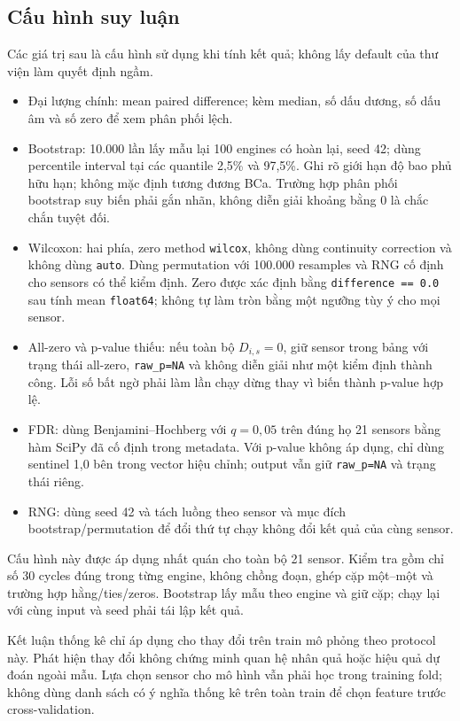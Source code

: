 \subsection{Cấu hình suy luận}
Các giá trị sau là cấu hình sử dụng khi tính kết quả; không lấy default của thư viện làm quyết định ngầm.
\begin{itemize}
\item Đại lượng chính: mean paired difference; kèm median, số dấu dương, số dấu âm và số zero để xem phân phối lệch.
\item Bootstrap: 10.000 lần lấy mẫu lại 100 engines có hoàn lại, seed 42; dùng percentile interval tại các quantile 2,5\% và 97,5\%. Ghi rõ giới hạn độ bao phủ hữu hạn; không mặc định tương đương BCa. Trường hợp phân phối bootstrap suy biến phải gắn nhãn, không diễn giải khoảng bằng 0 là chắc chắn tuyệt đối.
\item Wilcoxon: hai phía, zero method \texttt{wilcox}, không dùng continuity correction và không dùng \texttt{auto}. Dùng permutation với 100.000 resamples và RNG cố định cho sensors có thể kiểm định. Zero được xác định bằng \texttt{difference == 0.0} sau tính mean \texttt{float64}; không tự làm tròn bằng một ngưỡng tùy ý cho mọi sensor.
\item All-zero và p-value thiếu: nếu toàn bộ $D_{i,s}=0$, giữ sensor trong bảng với trạng thái all-zero, \texttt{raw\_p=NA} và không diễn giải như một kiểm định thành công. Lỗi số bất ngờ phải làm lần chạy dừng thay vì biến thành p-value hợp lệ.
\item FDR: dùng Benjamini--Hochberg với $q=0{,}05$ trên đúng họ 21 sensors bằng hàm SciPy đã cố định trong metadata. Với p-value không áp dụng, chỉ dùng sentinel 1,0 bên trong vector hiệu chỉnh; output vẫn giữ \texttt{raw\_p=NA} và trạng thái riêng.
\item RNG: dùng seed 42 và tách luồng theo sensor và mục đích bootstrap/permutation để đổi thứ tự chạy không đổi kết quả của cùng sensor.
\end{itemize}

Cấu hình này được áp dụng nhất quán cho toàn bộ 21 sensor. Kiểm tra gồm chỉ số 30 cycles đúng trong từng engine, không chồng đoạn, ghép cặp một--một và trường hợp hằng/ties/zeros. Bootstrap lấy mẫu theo engine và giữ cặp; chạy lại với cùng input và seed phải tái lập kết quả.

Kết luận thống kê chỉ áp dụng cho thay đổi trên train mô phỏng theo protocol này. Phát hiện thay đổi không chứng minh quan hệ nhân quả hoặc hiệu quả dự đoán ngoài mẫu. Lựa chọn sensor cho mô hình vẫn phải học trong training fold; không dùng danh sách có ý nghĩa thống kê trên toàn train để chọn feature trước cross-validation.
